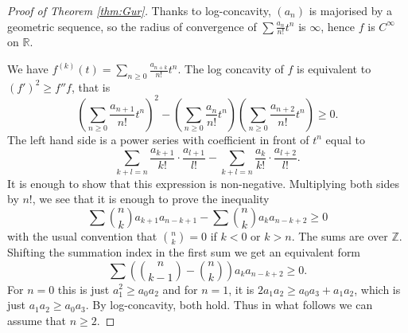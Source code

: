 \documentclass[10pt]{article}
\newcommand{\1}{\textbf{1}}
\newcommand{\R}{\mathbb{R}}
\newcommand{\Z}{\mathbb{Z}}
\theoremstyle{remark}
\theoremstyle{definition}
\begin{document}
\begin{proof}[Proof of Theorem \ref{thm:Gur}]
Thanks to log-concavity, $(a_n)$ is majorised by a geometric sequence, so the radius of convergence of $\sum \frac{a_n}{n!}t^n$ is $\infty$, hence $f$ is $C^\infty$ on $\R$.

We have $f^{(k)}(t) = \sum_{n \geq 0} \frac{a_{n+k}}{n!} t^n$. The log concavity of $f$ is equivalent to $(f')^2 \geq f'' f$, that is
\[
	\left( \sum_{n \geq 0} \frac{a_{n+1}}{n!} t^n \right)^2 - \left( \sum_{n \geq 0} \frac{a_{n}}{n!} t^n \right) \left( \sum_{n \geq 0} \frac{a_{n+2}}{n!} t^n \right) \geq 0.
\]  
The left hand side is a power series with coefficient in front of $t^n$ equal to
\[
	\sum_{k+l=n} \frac{a_{k+1}}{k!} \cdot \frac{a_{l+1}}{l!} - \sum_{k+l=n} \frac{a_{k}}{k!} \cdot \frac{a_{l+2}}{l!} .
\]
It is enough to show that this expression is non-negative. Multiplying both sides by $n!$, we see that it is enough to prove the inequality
\[
	\sum {n \choose k } a_{k+1} a_{n-k+1} - \sum {n \choose k } a_{k} a_{n-k+2} \geq 0
\]
with the usual convention that ${n \choose k} =0$ if $k<0$ or $k>n$. The sums are over $\Z$. Shifting the summation index in the first sum we get an equivalent form
\[
	\sum \left({n \choose k-1} - {n \choose k} \right) a_k a_{n-k+2} \geq 0.
\]
For $n=0$ this is just $a_1^2 \geq a_0 a_2$ and for $n=1$, it is $2a_1 a_2 \geq a_0 a_3 + a_1 a_2$, which is just $a_1 a_2 \geq a_0 a_3$. By log-concavity, both hold. Thus in what follows we can assume that $n \geq 2$.


\end{proof}
\end{document}
